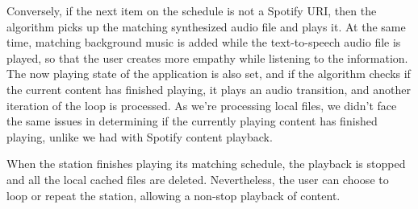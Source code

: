 Conversely, if the next item on the schedule is not a Spotify \ac{URI}, then the algorithm picks up the matching synthesized audio file and plays it. At the same time, matching background music is added while the text-to-speech audio file is played, so that the user creates more empathy while listening to the information. The now playing state of the application is also set, and if the algorithm checks if the current content has finished playing, it plays an audio transition, and another iteration of the loop is processed. As we're processing local files, we didn't face the same issues in determining if the currently playing content has finished playing, unlike we had with Spotify content playback.

When the station finishes playing its matching schedule, the playback is stopped and all the local cached files are deleted. Nevertheless, the user can choose to loop or repeat the station, allowing a non-stop playback of content.

